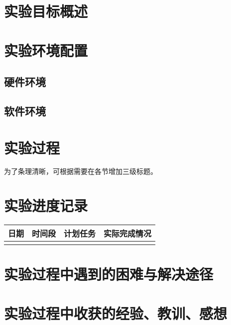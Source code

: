 \documentclass{sc}
\begin{document}
\maketitle

\tableofcontents
\newpage

\section{实验目标概述}

\section{实验环境配置}

\subsection{硬件环境}

\subsection{软件环境}


\section{实验过程}
为了条理清晰，可根据需要在各节增加三级标题。

\section{实验进度记录}

\begin{table}[H]
    \centering
    \begin{tabular}{cccc}
        \hline 
        日期 & 时间段 & 计划任务 & 实际完成情况 \\ 
        \hline 
             &        &           &                \\ 
        \hline 
    \end{tabular} 
\end{table}


\section{实验过程中遇到的困难与解决途径}

\section{实验过程中收获的经验、教训、感想}

%
\end{document}
